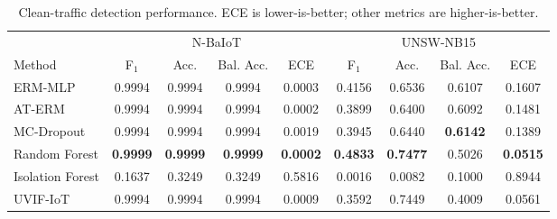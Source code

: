\begin{table}[t]
\caption{Clean-traffic detection performance. ECE is lower-is-better; other metrics are higher-is-better.}
\label{tab:clean}
\centering
\begin{tabular}{lcccccccc}
\toprule
& \multicolumn{4}{c}{N-BaIoT} & \multicolumn{4}{c}{UNSW-NB15} \\
\cmidrule(lr){2-5} \cmidrule(lr){6-9}
Method & F$_1$ & Acc. & Bal. Acc. & ECE & F$_1$ & Acc. & Bal. Acc. & ECE \\
\midrule
ERM-MLP & 0.9994 & 0.9994 & 0.9994 & 0.0003 & 0.4156 & 0.6536 & 0.6107 & 0.1607 \\
AT-ERM & 0.9994 & 0.9994 & 0.9994 & 0.0002 & 0.3899 & 0.6400 & 0.6092 & 0.1481 \\
MC-Dropout & 0.9994 & 0.9994 & 0.9994 & 0.0019 & 0.3945 & 0.6440 & \textbf{0.6142} & 0.1389 \\
Random Forest & \textbf{0.9999} & \textbf{0.9999} & \textbf{0.9999} & \textbf{0.0002} & \textbf{0.4833} & \textbf{0.7477} & 0.5026 & \textbf{0.0515} \\
Isolation Forest & 0.1637 & 0.3249 & 0.3249 & 0.5816 & 0.0016 & 0.0082 & 0.1000 & 0.8944 \\
UVIF-IoT & 0.9994 & 0.9994 & 0.9994 & 0.0009 & 0.3592 & 0.7449 & 0.4009 & 0.0561 \\
\bottomrule
\end{tabular}
\end{table}